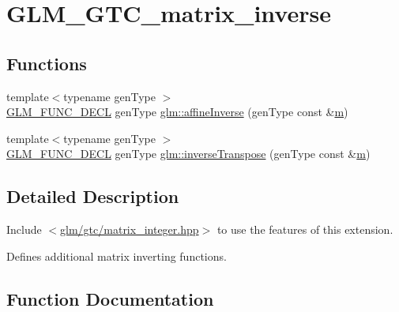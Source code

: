 \hypertarget{group__gtc__matrix__inverse}{}\section{G\+L\+M\+\_\+\+G\+T\+C\+\_\+matrix\+\_\+inverse}
\label{group__gtc__matrix__inverse}
\subsection*{Functions}
\begin{DoxyCompactItemize}
\item 
{\footnotesize template$<$typename gen\+Type $>$ }\\\hyperlink{setup_8hpp_ab2d052de21a70539923e9bcbf6e83a51}{G\+L\+M\+\_\+\+F\+U\+N\+C\+\_\+\+D\+E\+CL} gen\+Type \hyperlink{group__gtc__matrix__inverse_gae0fcc5fc8783291f9702272de428fa0e}{glm\+::affine\+Inverse} (gen\+Type const \&\hyperlink{_s_d_l__opengl__glext_8h_af593500c283bf1a787a6f947f503a5c2}{m})
\item 
{\footnotesize template$<$typename gen\+Type $>$ }\\\hyperlink{setup_8hpp_ab2d052de21a70539923e9bcbf6e83a51}{G\+L\+M\+\_\+\+F\+U\+N\+C\+\_\+\+D\+E\+CL} gen\+Type \hyperlink{group__gtc__matrix__inverse_gab213cd0e3ead5f316d583f99d6312008}{glm\+::inverse\+Transpose} (gen\+Type const \&\hyperlink{_s_d_l__opengl__glext_8h_af593500c283bf1a787a6f947f503a5c2}{m})
\end{DoxyCompactItemize}


\subsection{Detailed Description}
Include $<$\hyperlink{matrix__integer_8hpp}{glm/gtc/matrix\+\_\+integer.\+hpp}$>$ to use the features of this extension.

Defines additional matrix inverting functions. 

\subsection{Function Documentation}
\mbox{\label{group__gtc__matrix__inverse_gae0fcc5fc8783291f9702272de428fa0e}} 
